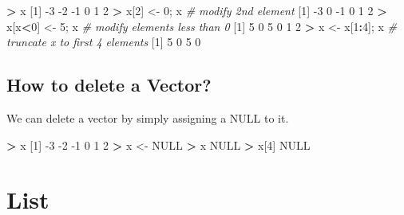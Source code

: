 \documentclass[]{book}
\newenvironment{Shaded}{\begin{snugshade}}{\end{snugshade}}
\newcommand{\CommentTok}[1]{\textcolor[rgb]{0.56,0.35,0.01}{\textit{#1}}}
\newcommand{\DecValTok}[1]{\textcolor[rgb]{0.00,0.00,0.81}{#1}}
\newcommand{\NormalTok}[1]{#1}
\newcommand{\OperatorTok}[1]{\textcolor[rgb]{0.81,0.36,0.00}{\textbf{#1}}}
\newcommand{\OtherTok}[1]{\textcolor[rgb]{0.56,0.35,0.01}{#1}}
\newcommand{\StringTok}[1]{\textcolor[rgb]{0.31,0.60,0.02}{#1}}
\theoremstyle{definition}
\theoremstyle{definition}
\theoremstyle{definition}
\theoremstyle{remark}
\begin{document}
\begin{Shaded}
\begin{Highlighting}[]
\OperatorTok{>}\StringTok{ }\NormalTok{x}
\NormalTok{[}\DecValTok{1}\NormalTok{] }\DecValTok{-3} \DecValTok{-2} \DecValTok{-1}  \DecValTok{0}  \DecValTok{1}  \DecValTok{2}
\OperatorTok{>}\StringTok{ }\NormalTok{x[}\DecValTok{2}\NormalTok{] <-}\StringTok{ }\DecValTok{0}\NormalTok{; x        }\CommentTok{# modify 2nd element}
\NormalTok{[}\DecValTok{1}\NormalTok{] }\DecValTok{-3}  \DecValTok{0} \DecValTok{-1}  \DecValTok{0}  \DecValTok{1}  \DecValTok{2}
\OperatorTok{>}\StringTok{ }\NormalTok{x[x}\OperatorTok{<}\DecValTok{0}\NormalTok{] <-}\StringTok{ }\DecValTok{5}\NormalTok{; x   }\CommentTok{# modify elements less than 0}
\NormalTok{[}\DecValTok{1}\NormalTok{] }\DecValTok{5} \DecValTok{0} \DecValTok{5} \DecValTok{0} \DecValTok{1} \DecValTok{2}
\OperatorTok{>}\StringTok{ }\NormalTok{x <-}\StringTok{ }\NormalTok{x[}\DecValTok{1}\OperatorTok{:}\DecValTok{4}\NormalTok{]; x      }\CommentTok{# truncate x to first 4 elements}
\NormalTok{[}\DecValTok{1}\NormalTok{] }\DecValTok{5} \DecValTok{0} \DecValTok{5} \DecValTok{0}
\end{Highlighting}
\end{Shaded}

\hypertarget{how-to-delete-a-vector}{%
\subsection{How to delete a Vector?}\label{how-to-delete-a-vector}}

We can delete a vector by simply assigning a NULL to it.

\begin{Shaded}
\begin{Highlighting}[]
\OperatorTok{>}\StringTok{ }\NormalTok{x}
\NormalTok{[}\DecValTok{1}\NormalTok{] }\DecValTok{-3} \DecValTok{-2} \DecValTok{-1}  \DecValTok{0}  \DecValTok{1}  \DecValTok{2}
\OperatorTok{>}\StringTok{ }\NormalTok{x <-}\StringTok{ }\OtherTok{NULL}
\OperatorTok{>}\StringTok{ }\NormalTok{x}
\OtherTok{NULL}
\OperatorTok{>}\StringTok{ }\NormalTok{x[}\DecValTok{4}\NormalTok{]}
\OtherTok{NULL}
\end{Highlighting}
\end{Shaded}

\hypertarget{list}{%
\section{List}\label{list}}
\end{document}
